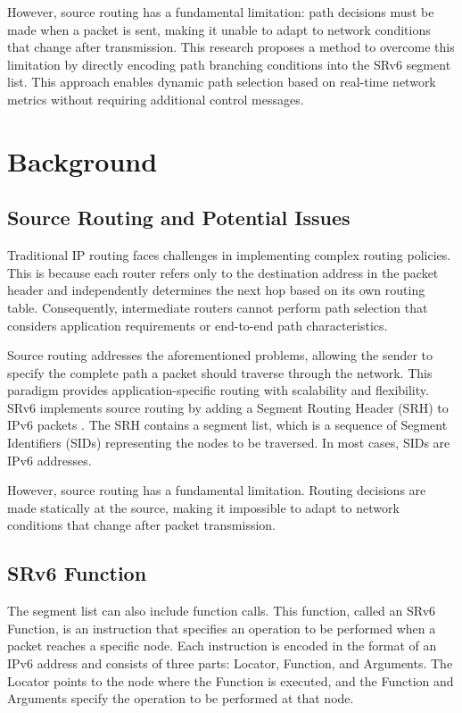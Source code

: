 \documentclass[conference]{IEEEtran}
\begin{document}
However, source routing has a fundamental limitation: path decisions must be made when a packet is sent, making it unable to adapt to network conditions that change after transmission.
This research proposes a method to overcome this limitation by directly encoding path branching conditions into the SRv6 segment list.
This approach enables dynamic path selection based on real-time network metrics without requiring additional control messages.

\section{Background}

\subsection{Source Routing and Potential Issues}

Traditional IP routing faces challenges in implementing complex routing policies.
This is because each router refers only to the destination address in the packet header and independently determines the next hop based on its own routing table.
Consequently, intermediate routers cannot perform path selection that considers application requirements or end-to-end path characteristics.

Source routing addresses the aforementioned problems, allowing the sender to specify the complete path a packet should traverse through the network.
This paradigm provides application-specific routing with scalability and flexibility. SRv6 implements source routing by adding a Segment Routing Header (SRH) to IPv6 packets \cite{rfc8754}\cite{rfc9256}.
The SRH contains a segment list, which is a sequence of Segment Identifiers (SIDs) representing the nodes to be traversed.
In most cases, SIDs are IPv6 addresses.

However, source routing has a fundamental limitation.
Routing decisions are made statically at the source, making it impossible to adapt to network conditions that change after packet transmission.

\subsection{SRv6 Function}

The segment list can also include function calls.
This function, called an SRv6 Function, is an instruction that specifies an operation to be performed when a packet reaches a specific node.
Each instruction is encoded in the format of an IPv6 address and consists of three parts: Locator, Function, and Arguments.
The Locator points to the node where the Function is executed, and the Function and Arguments specify the operation to be performed at that node.
\end{document}
